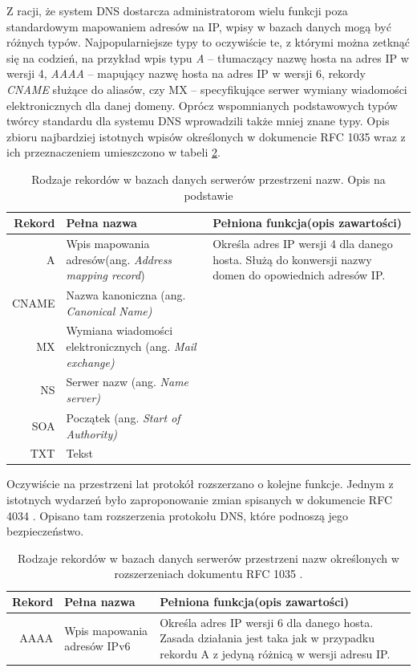 Z racji, że system DNS dostarcza administratorom wielu funkcji poza standardowym mapowaniem adresów na IP, wpisy w bazach danych mogą być różnych typów. Najpopularniejsze typy to oczywiście te, z którymi można zetknąć się na codzień, na przykład wpis typu \textit{A} -- tłumaczący nazwę hosta na adres IP w wersji 4, \textit{AAAA} -- mapujący nazwę hosta na adres IP w wersji 6, rekordy \textit{CNAME} służące do aliasów, czy MX -- specyfikujące serwer wymiany wiadomości elektronicznych dla danej domeny. Oprócz wspomnianych podstawowych typów twórcy standardu dla systemu DNS wprowadzili także mniej znane typy. Opis zbioru najbardziej istotnych wpisów określonych w dokumencie RFC 1035 \cite{} wraz z ich przeznaczeniem umieszczono w tabeli \ref{typyRekordowDns}.

\begin{table}[]
	\centering
	\caption{Rodzaje rekordów w bazach danych serwerów przestrzeni nazw. Opis na podstawie \cite{}}
	\label{typyRekordowDns}
	\begin{tabular}{|r|p{3cm}|p{8cm}|}
		\hline
			\textbf{Rekord} & 
			\textbf{Pełna nazwa} & 
			\textbf{Pełniona funkcja(opis zawartości)} \\
		\hline\hline
			A & 
			Wpis mapowania adresów(ang. \textit{Address mapping record}) & 
			Określa adres IP wersji 4 dla danego hosta. Służą do konwersji nazwy domen do opowiednich adresów IP.\\
		\hline
			CNAME & 
			Nazwa kanoniczna (ang. \textit{Canonical Name)} & 
			\\
		\hline
			MX & 
			Wymiana wiadomości elektronicznych (ang. \textit{Mail exchange)} & 
			\\
		\hline
			NS & 
			Serwer nazw (ang. \textit{Name server)} & 
			\\		
		\hline
			SOA & 
			Początek (ang. \textit{Start of Authority)} & 
			\\
		\hline
			TXT & 
			Tekst & 
		\\
		\hline
		
	\end{tabular}
\end{table}

Oczywiście na przestrzeni lat protokół rozszerzano o kolejne funkcje. Jednym z istotnych wydarzeń było zaproponowanie zmian spisanych w dokumencie RFC 4034 \cite{}. Opisano tam rozszerzenia protokołu DNS, które podnoszą jego bezpieczeństwo. 

\begin{table}[]
	\centering
	\caption{Rodzaje rekordów w bazach danych serwerów przestrzeni nazw określonych w rozszerzeniach dokumentu RFC 1035 \cite{}.}
	\label{typyRekordowDns}
	\begin{tabular}{|r|p{3cm}|p{8cm}|}
		\hline
		\textbf{Rekord} & 
		\textbf{Pełna nazwa} & 
		\textbf{Pełniona funkcja(opis zawartości)} \\
		\hline\hline
			AAAA & 
			Wpis mapowania adresów IPv6 & 
			Określa adres IP wersji 6 dla danego hosta. Zasada działania jest taka jak w przypadku rekordu A z jedyną różnicą w wersji adresu IP. \\
		\hline
	\end{tabular}
\end{table}


